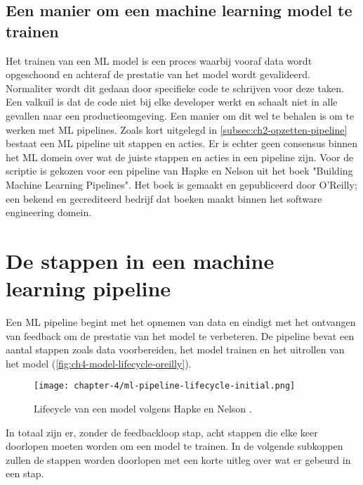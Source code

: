 \subsection{Een manier om een machine learning model te trainen}\label{subsec:ch4-een-manier-om-een-machine-learning-model-te-trainen}
Het trainen van een ML model is een proces waarbij vooraf data wordt opgeschoond en achteraf de prestatie van het model wordt gevalideerd. Normaliter wordt dit gedaan door specifieke code te schrijven voor deze taken. Een valkuil is dat de code niet bij elke developer werkt en schaalt niet in alle gevallen naar een productieomgeving. Een manier om dit wel te behalen is om te werken met ML pipelines. Zoals kort uitgelegd in \autoref{subsec:ch2-opzetten-pipeline} bestaat een ML pipeline uit stappen en acties. Er is echter geen consensus binnen het ML domein over wat de juiste stappen en acties in een pipeline zijn. Voor de scriptie is gekozen voor een pipeline van Hapke en Nelson uit het boek "Building Machine Learning Pipelines". Het boek is gemaakt en gepubliceerd door O'Reilly; een bekend en gecrediteerd bedrijf dat boeken maakt binnen het software engineering domein.

\section{De stappen in een machine learning pipeline}\label{sec:ch4-de-stappen-in-een-machine-learning-pipeline}
Een ML pipeline begint met het opnemen van data en eindigt met het ontvangen van feedback om de prestatie van het model te verbeteren. De pipeline bevat een aantal stappen zoals data voorbereiden, het model trainen en het uitrollen van het model (\autoref{fig:ch4-model-lifecycle-oreilly}).

\begin{figure}[hbt!]
  \centering
  \texttt{[image: chapter-4/ml-pipeline-lifecycle-initial.png]}
  \caption{Lifecycle van een model volgens Hapke en Nelson \cite[p.~4]{building-machine-learning-pipelines-oreilly}.}
  \label{fig:ch4-model-lifecycle-oreilly}
\end{figure}

In totaal zijn er, zonder de feedbackloop stap, acht stappen die elke keer doorlopen moeten worden om een model te trainen. In de volgende subkoppen zullen de stappen worden doorlopen met een korte uitleg over wat er gebeurd in een stap. 

